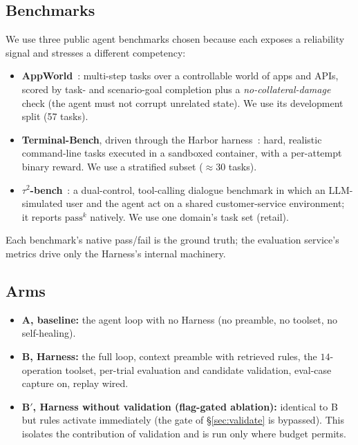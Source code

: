 \documentclass[letterpaper]{article} %
\newcommand{\passk}{\mathrm{pass}^{k}}
\begin{document}
\subsection{Benchmarks}
We use three public agent benchmarks chosen because each exposes a reliability signal and
stresses a different competency:
\begin{itemize}\itemsep2pt
\item \textbf{AppWorld}~\citep{trivedi2024appworld}: multi-step tasks over a controllable world of
apps and APIs, scored by task- and scenario-goal completion plus a \emph{no-collateral-damage}
check (the agent must not corrupt unrelated state). We use its development split (57 tasks).
\item \textbf{Terminal-Bench}, driven through the Harbor harness~\citep{merrill2026terminal}:
hard, realistic command-line tasks executed in a sandboxed container, with a per-attempt binary
reward. We use a stratified subset ($\approx\!30$ tasks).
\item \textbf{$\tau^2$-bench}~\citep{barres2025tau}: a dual-control, tool-calling dialogue
benchmark in which an LLM-simulated user and the agent act on a shared customer-service
environment; it reports $\passk$ natively. We use one domain's task set (retail).
\end{itemize}
Each benchmark's native pass/fail is the ground truth; the evaluation service's metrics drive
only the Harness's internal machinery.

\subsection{Arms}
\label{sec:arms}
\begin{itemize}\itemsep2pt
\item \textbf{A, baseline:} the agent loop with no Harness (no preamble, no toolset, no
self-healing).
\item \textbf{B, Harness:} the full loop, context preamble with retrieved rules, the
$14$-operation toolset, per-trial evaluation and candidate validation, eval-case capture on,
replay wired.
\item \textbf{B$'$, Harness without validation (flag-gated ablation):} identical to B but rules
activate immediately (the gate of \S\ref{sec:validate} is bypassed). This isolates the
contribution of validation and is run only where budget permits.
\end{itemize}
\end{document}
